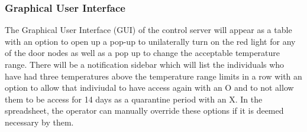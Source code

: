 \subsubsection{Graphical User Interface}
The Graphical User Interface (GUI) of the control server will appear as a table
with an option to open up a pop-up to unilaterally turn on the red light for any
of the door nodes as well as a pop up to change the acceptable temperature
range. There will be a notification sidebar which will list the individuals who
have had three temperatures above the temperature range limits in a row with an
option to allow that indiviudal to have access again with an O and to not allow
them to be access for 14 days as a quarantine period with an X. In the
spreadsheet, the operator can manually override these options if it is deemed
necessary by them.

